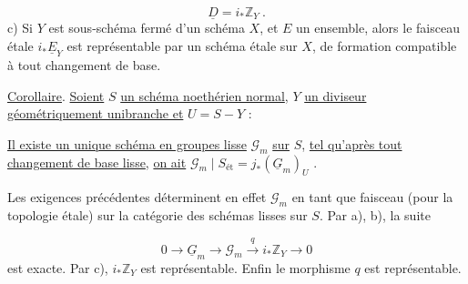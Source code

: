 \begin{equation*}
\underline{D} = i_* \mathbb{Z}_Y \ .
\end{equation*}
c) Si $Y$ est sous-schéma fermé d'un schéma $X$, et $E$ un ensemble, alors le faisceau étale $i_* \underline{E}_Y$ est représentable par un schéma étale sur $X$, de formation compatible à tout changement de base.

\underline{Corollaire}. \underline{Soient} $S$ \underline{un schéma noethérien normal}, $Y$ \underline{un diviseur géométriquement unibranche et} $U = S-Y$ :

\begin{center}
\end{center}
\underline{Il existe un unique schéma en groupes lisse} $\mathcal{G}_m$ \underline{sur} $S$, \underline{tel qu'après tout changement de base lisse}, \underline{on ait} $\mathcal{G}_m \mid S_{\text{\'et}} = j_*(\underline{G}_m)_U$ .

Les exigences précédentes déterminent en effet $\mathcal{G}_m$ en tant que faisceau (pour la topologie étale) sur la catégorie des schémas lisses sur $S$. Par a), b), la suite

\begin{equation*}
0 \longrightarrow \underline{G}_m \longrightarrow \mathcal{G}_m \xrightarrow{\ q\ } i_* \mathbb{Z}_Y \longrightarrow 0
\end{equation*}
est exacte. Par c), $i_* \mathbb{Z}_Y$ est représentable. Enfin le morphisme $q$ est représentable.


